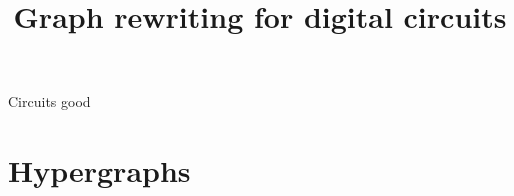 \title{Graph rewriting for digital circuits}


    \maketitle

    Circuits good

    \section{Hypergraphs}
